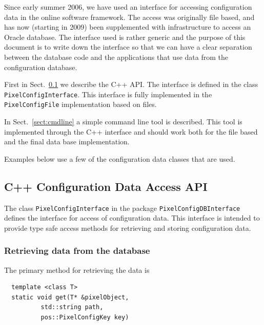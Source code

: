 Since early summer 2006, we have used an interface for accessing
configuration data in the online software framework. 
The access was originally file based, and has now (starting in 2009) been
supplemented with infrastructure to access an Oracle database. The 
interface used is rather generic and the purpose of this document
is to write down the interface so that we can have a 
clear separation between the database code and the applications 
that use data from the configuration database.

First in Sect.~\ref{sect:cppinterface} we describe the C++ API.
The interface is defined in the class {\tt PixelConfigInterface}.
This interface is fully implemented in the {\tt PixelConfigFile}
implementation based on files.

In Sect.~\ref{sect:cmdline} a simple command line tool is described.
This tool is implemented through the C++ interface and should work
both for the file based and the final data base implementation.

Examples below use a few of the configuration data classes that are used. 

\subsection{C++ Configuration Data Access API}
\label{sect:cppinterface} 

The class {\tt PixelConfigInterface} in the package 
{\tt PixelConfigDBInterface} defines the interface for
access of configuration data. This interface is intended
to provide type safe access methods for retrieving and
storing configuration data.

\subsubsection{Retrieving data from the database}

The primary method for retrieving the data is
\begin{verbatim}
  template <class T>
  static void get(T* &pixelObject,
		  std::string path,
		  pos::PixelConfigKey key)
\end{verbatim}

